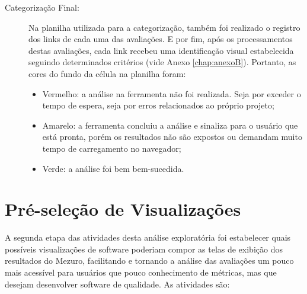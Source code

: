 \begin{description}
  \item [Categorização Final:]
    Na planilha utilizada para a categorização, também foi realizado o registro
    dos links de cada uma das avaliações. E por fim, após os processamentos
    destas avaliações, cada link recebeu uma identificação visual estabelecida
    seguindo determinados critérios (vide Anexo \ref{chap:anexoB}). Portanto, as
    cores do fundo da célula na planilha foram:
    \begin{itemize}
      \item Vermelho: a análise na ferramenta não foi realizada. Seja por
            exceder o tempo de espera, seja por erros relacionados ao próprio
            projeto;
      \item Amarelo: a ferramenta concluiu a análise e sinaliza para o usuário
            que está pronta, porém os resultados não são expostos ou demandam
            muito tempo de carregamento no navegador;
      \item Verde: a análise foi bem bem-sucedida.
    \end{itemize}
\end{description}


\section{Pré-seleção de Visualizações}

A segunda etapa das atividades desta análise exploratória foi estabelecer quais
possíveis visualizações de software poderiam compor as telas de exibição dos
resultados do Mezuro, facilitando e tornando a análise das avaliações um pouco
mais acessível para usuários que pouco conhecimento de métricas, mas que desejam
desenvolver software de qualidade. As atividades são:

